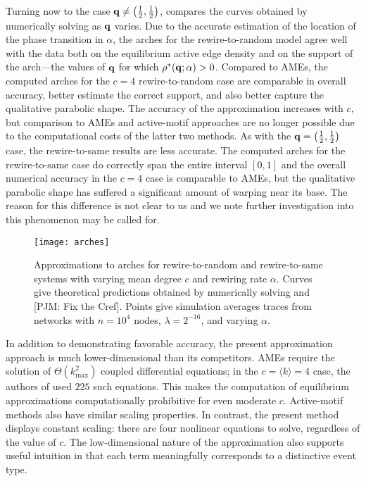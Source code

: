 \documentclass[review, onefignum, onetabnum]{siamart171218}
\newcommand{\pjm}[1]{{\color{blue}[PJM: #1]}}
\begin{document}
		Turning now to the case $\mathbf{q} \neq \left(\frac{1}{2}, \frac{1}{2}\right)$,  compares the curves obtained by numerically solving  as $\mathbf{q}$ varies. 
		Due to the accurate estimation of the location of the phase transition in $\alpha$, the arches for the rewire-to-random model agree well with the data both on the equilibrium active edge density and on the support of the arch---the values of $\mathbf{q}$ for which $\rho^*(\mathbf{q};\alpha) > 0$. 
		Compared to AMEs, the computed arches for the $c = 4$ rewire-to-random case are comparable in overall accuracy, better estimate the correct support, and also better capture the qualitative parabolic shape.  
		The accuracy of the approximation increases with $c$, but comparison to AMEs and active-motif approaches are no longer possible due to the computational costs of the latter two methods. 
		As with the $\mathbf{q} = \left(\frac{1}{2}, \frac{1}{2}\right)$ case, the rewire-to-same results are less accurate. 
		The computed arches for the rewire-to-same case do correctly span the entire interval $[0,1]$ and 
		the overall numerical accuracy in the $c = 4$ case is comparable to AMEs, but the qualitative parabolic shape has suffered a significant amount of warping near its base. 
		The reason for this difference is not clear to us and we note further investigation into this phenomenon may be called for. 

		\begin{figure}
			\centering
				\texttt{[image: arches]}
			\caption{Approximations to arches for rewire-to-random and rewire-to-same systems with varying mean degree $c$ and rewiring rate $\alpha$. 
			Curves give theoretical predictions obtained by numerically solving  and  \pjm{Fix the Cref}. 
			Points give simulation averages traces from networks with $n = 10^4$ nodes,  $\lambda = 2^{-16}$, and varying $\alpha$.}
			\label{fig:arches}
		\end{figure}

		In addition to demonstrating favorable accuracy, the present approximation approach is much lower-dimensional than its competitors. 
		AMEs require the solution of $\Theta\left(k_\mathrm{max}^2\right)$ coupled differential equations; in the $c = \langle k\rangle = 4$ case, the authors of \cite{Durrett2012} used $225$ such equations. 
		This makes the computation of equilibrium approximations computationally prohibitive for even moderate $c$. 
		Active-motif methods also have similar scaling properties. 
		In contrast, the present method displays constant scaling: there are four nonlinear equations to solve, regardless of the value of $c$. 
		The low-dimensional nature of the approximation also supports useful intuition in that each term meaningfully corresponds to a distinctive event type.
\end{document}
